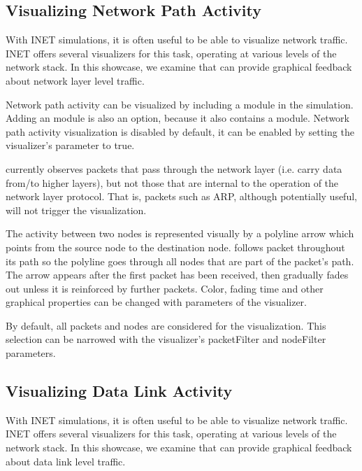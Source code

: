 \subsection{Visualizing Network Path Activity}
\label{sec:visualization:network-path-activity}

With INET simulations, it is often useful to be able to visualize network
traffic. INET offers several visualizers for this task, operating at various
levels of the network stack. In this showcase, we examine 
that can provide graphical feedback about network layer level traffic.

Network path activity can be visualized by including a 
module in the simulation. Adding an  module is also an
option, because it also contains a  module. Network path
activity visualization is disabled by default, it can be enabled by setting the
visualizer's  parameter to true.

 currently observes packets that pass through the network
layer (i.e. carry data from/to higher layers), but not those that are internal
to the operation of the network layer protocol. That is, packets such as ARP,
although potentially useful, will not trigger the visualization.

The activity between two nodes is represented visually by a polyline arrow which
points from the source node to the destination node. 
follows packet throughout its path so the polyline goes through all nodes that
are part of the packet's path. The arrow appears after the first packet has been
received, then gradually fades out unless it is reinforced by further packets.
Color, fading time and other graphical properties can be changed with parameters
of the visualizer.

By default, all packets and nodes are considered for the visualization. This
selection can be narrowed with the visualizer's packetFilter and nodeFilter
parameters.


\subsection{Visualizing Data Link Activity}
\label{sec:visualization:data-link-activity}

With INET simulations, it is often useful to be able to visualize network
traffic. INET offers several visualizers for this task, operating at various
levels of the network stack. In this showcase, we examine 
that can provide graphical feedback about data link level traffic.

